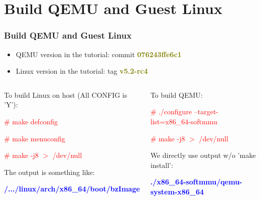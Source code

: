 \documentclass[aspectratio=169]{beamer}
\begin{document}
\section{Build QEMU and Guest Linux}
\begin{frame}
\frametitle{Build QEMU and Guest Linux}
\begin{itemize}
\item {\Large QEMU version in the tutorial: commit \textbf{\textcolor{olive}{076243ffe6c1}}}
\item {\Large Linux version in the tutorial: tag \textbf{\textcolor{olive}{v5.2-rc4}}}
\end{itemize}
\begin{columns}[c]
\begin{block}{}
{ \small
To build Linux on host (All CONFIG is 'Y'):

\textcolor{red}{\# make defconfig}

\textcolor{red}{\# make menuconfig}

\textcolor{red}{\# make -j8 $>$ /dev/null} \newline

The output is something like:

\textbf{\textcolor{blue}{/.../linux/arch/x86\_64/boot/bzImage}}
}
\end{block}
\begin{block}{}
{ \small
To build QEMU:

\textcolor{red}{\# ./configure --target-list=x86\_64-softmmu}

\textcolor{red}{\# make -j8 $>$ /dev/null} \newline

We directly use output w/o 'make install':

\textbf{\textcolor{blue}{./x86\_64-softmmu/qemu-system-x86\_64}}
}
\end{block}
\end{columns}
\end{frame}

\end{document}

